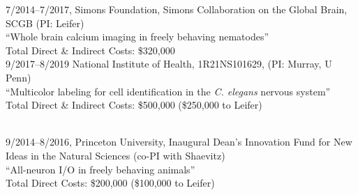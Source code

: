 \documentclass[11pt]{article}
\begin{document}
7/2014--7/2017, Simons Foundation, Simons Collaboration on the Global Brain, SCGB  (PI: Leifer) \\
``Whole brain calcium imaging in freely behaving nematodes''\\
Total Direct \& Indirect Costs: \$320,000\\

9/2017--8/2019  National Institute of Health, 1R21NS101629, (PI: Murray, U Penn)\\
``Multicolor labeling for cell identification in the \textit{C. elegans} nervous system''\\ 
Total Direct \& Indirect Costs: \$500,000  (\$250,000 to Leifer) \\\

9/2014--8/2016, Princeton University, Inaugural Dean's Innovation Fund for New Ideas in the Natural Sciences (co-PI with Shaevitz)\\
``All-neuron I/O in freely behaving animals''\\
Total Direct Costs: \$200,000 (\$100,000 to Leifer) \\
\end{document}
